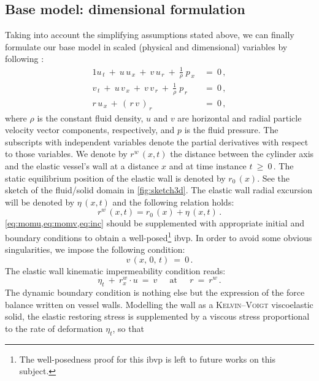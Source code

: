 \documentclass[alpha-refs, 12pt]{wiley-article}
\renewcommand{\geq}{\geqslant}
\begin{document}
\subsection{Base model: dimensional formulation}

Taking into account the simplifying assumptions stated above, we can finally formulate our base model in scaled (physical and dimensional) variables by following \cite{Mitsotakis2018, Mitsotakis2019}:
\begin{alignat}{1}
   u_{\,t}\ +\ u\,u_{\,x}\ +\ v\,u_{\,r}\ +\ \frac{1}{\rho}\;p_{\,x}\ &=\ 0\,, \label{eq:momu} \\
   v_{\,t}\ +\ u\,v_{\,x}\ +\ v\,v_{\,r}\ +\ \frac{1}{\rho}\;p_{\,r}\ &=\ 0\,, \label{eq:momv} \\
   r\,u_{\,x}\,+\,(\,r\,v\,)_{\,r}\ &=\ 0\,, \label{eq:inc}
\end{alignat}
where $\rho$ is the constant fluid density, $u$ and $v$ are horizontal and radial particle velocity vector components, respectively, and $p$ is the fluid pressure. The subscripts with independent variables denote the partial derivatives with respect to those variables. We denote by $r^{w}\,(x,t)$ the distance between the cylinder axis and the elastic vessel's wall at a distance $x$ and at time instance $t\ \geq\ 0\,$. The static equilibrium position of the elastic wall is denoted by $r_{0}\,(x)$. See the sketch of the fluid/solid domain in \cref{fig:sketch3d}. The elastic wall radial excursion will be denoted by $\eta\,(x,t)$ and the following relation holds:
\begin{equation*}
    r^{w}\,(x,t) = r_{0}\,(x) + \eta\,(x,t)\,.
\end{equation*}
\cref{eq:momu,eq:momv,eq:inc} should be supplemented with appropriate initial and boundary conditions to obtain a well-posed\footnote{The well-posedness proof for this \gls{ibvp} is left to future works on this subject.} \gls{ibvp}. In order to avoid some obvious singularities, we impose the following condition:
\begin{equation*}
    v\,(x,\,0,\,t)\ =\ 0\,.
\end{equation*}
The elastic wall kinematic impermeability condition reads:
\begin{equation*}
  \eta_{t}\ +\ r^{w}_{x}\cdot u\ =\ v\ \quad\ \mbox{at}\ \quad\ r\ =\ r^{w}\,.
\end{equation*}
The dynamic boundary condition is nothing else but the expression of the force balance written on vessel walls. Modelling the wall as a \textsc{Kelvin}--\textsc{Voigt} viscoelastic solid, the elastic restoring stress is supplemented by a viscous stress proportional to the rate of deformation $\eta_{t}$, so that
\end{document}
